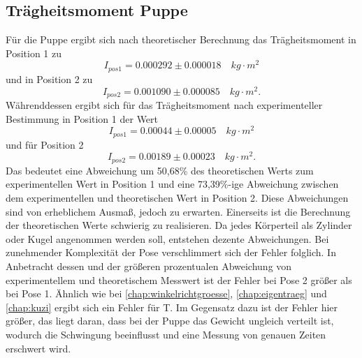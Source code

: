 \subsection{Trägheitsmoment Puppe}
Für die Puppe ergibt sich nach theoretischer Berechnung das Trägheitsmoment
in Position 1 zu 
\begin{equation*}
    I_{pos1}= 0.000292 \pm 0.000018 \quad kg \cdot m^2
\end{equation*}
und in Position 2 zu 
\begin{equation*}
    I_{pos2}= 0.001090 \pm 0.000085 \quad kg \cdot m^2.
\end{equation*}
Währenddessen ergibt sich für das Trägheitsmoment nach experimenteller
Bestimmung in Position 1 der Wert
\begin{equation*}
    I_{pos1}= 0.00044 \pm 0.00005 \quad kg \cdot m^2
\end{equation*}
und für Position 2
\begin{equation*}
    I_{pos2}= 0.00189 \pm 0.00023 \quad kg \cdot m^2.
\end{equation*}
Das bedeutet eine Abweichung um 50,68\% des theoretischen Werts zum
experimentellen Wert in Position 1 und eine 73,39\%-ige Abweichung zwischen
dem experimentellen und theoretischen Wert in Position 2. Diese Abweichungen
sind von erheblichem Ausmaß, jedoch zu erwarten. Einerseits ist die Berechnung 
der theoretischen Werte schwierig zu realisieren. Da jedes Körperteil als 
Zylinder oder Kugel angenommen werden soll, entstehen dezente Abweichungen.
Bei zunehmender Komplexität der Pose verschlimmert sich der Fehler folglich.
In Anbetracht dessen und der größeren prozentualen Abweichung von experimentellem 
und theoretischem Messwert ist der Fehler bei Pose 2 größer als bei Pose 1.
Ähnlich wie bei \ref{chap:winkelrichtgroesse}, \ref{chap:eigentraeg} und 
\ref{chap:kuzi} ergibt sich ein Fehler für T. Im Gegensatz dazu ist der Fehler
hier größer, das liegt daran, dass bei der Puppe das Gewicht ungleich verteilt
ist, wodurch die Schwingung beeinflusst und eine Messung von genauen Zeiten
erschwert wird.